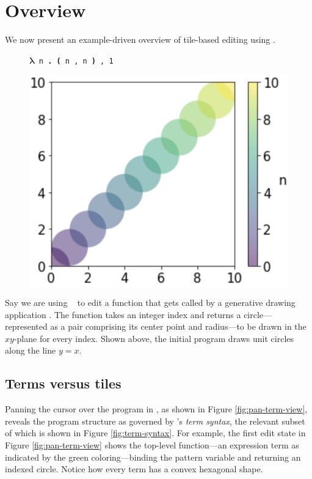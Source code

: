 \section{Overview}\label{sec:overview}

% 
% 


We now present an example-driven overview of tile-based
editing using \tylr.

\setlength\intextsep{0pt}
\begin{figure}
  \centering
  \texttt{$\boldsymbol{\lambda}$ n \textbf{.} \textbf{(} n , n \textbf{)} , 1}
  \vspace{0.2cm}

  \includegraphics[width=0.43\columnwidth]{img/circles-n-n-1.png}
\end{figure}

Say we are using \tylr~ to edit a function that gets called by a
generative drawing application \cite{Processing,sns-pldi}.
The function takes an integer index and
returns a circle---represented as a pair comprising
its center point and radius---to be drawn in
the $xy$-plane for every index.
Shown above, the initial program draws unit circles
along the line $y = x$.

\subsection{Terms versus tiles}



% 

Panning the cursor over the program in \tylr,
as shown in Figure \ref{fig:pan-term-view},
reveals the program structure as
governed by \tylr's \emph{term syntax},
the relevant subset of which is shown in
Figure \ref{fig:term-syntax}.
For example, the first edit state in Figure \ref{fig:pan-term-view}
shows the top-level function---an expression term as
indicated by the green coloring---binding
the pattern variable  and returning an indexed circle.
Notice how every term has a convex hexagonal shape.

